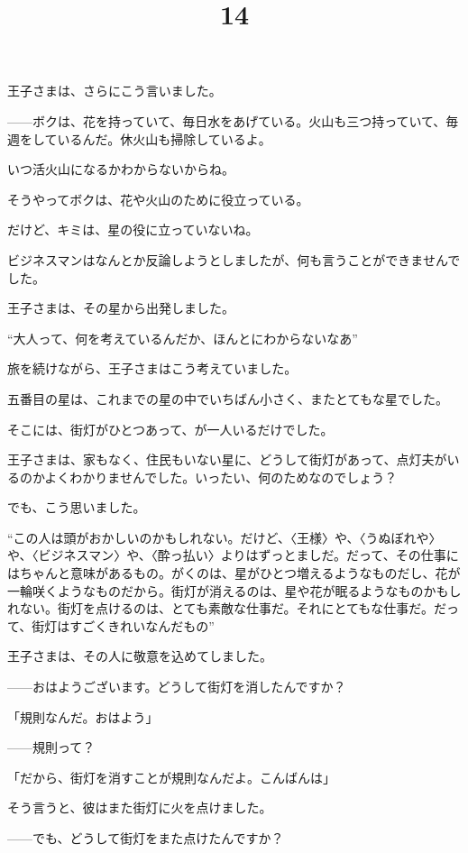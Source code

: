 王子さまは、さらにこう言いました。

——ボクは、花を持っていて、毎日水をあげている。火山も三つ持っていて、毎週をしているんだ。休火山も掃除しているよ。

いつ活火山になるかわからないからね。

そうやってボクは、花や火山のために役立っている。

だけど、キミは、星の役に立っていないね。

ビジネスマンはなんとか反論しようとしましたが、何も言うことができませんでした。

王子さまは、その星から出発しました。

“大人って、何を考えているんだか、ほんとにわからないなあ”

旅を続けながら、王子さまはこう考えていました。


\title{14}


五番目の星は、これまでの星の中でいちばん小さく、またとてもな星でした。

そこには、街灯がひとつあって、が一人いるだけでした。

王子さまは、家もなく、住民もいない星に、どうして街灯があって、点灯夫がいるのかよくわかりませんでした。いったい、何のためなのでしょう？

でも、こう思いました。

“この人は頭がおかしいのかもしれない。だけど、〈王様〉や、〈うぬぼれや〉や、〈ビジネスマン〉や、〈酔っ払い〉よりはずっとましだ。だって、その仕事にはちゃんと意味があるもの。がくのは、星がひとつ増えるようなものだし、花が一輪咲くようなものだから。街灯が消えるのは、星や花が眠るようなものかもしれない。街灯を点けるのは、とても素敵な仕事だ。それにとてもな仕事だ。だって、街灯はすごくきれいなんだもの”

王子さまは、その人に敬意を込めてしました。

——おはようございます。どうして街灯を消したんですか？

「規則なんだ。おはよう」

——規則って？

「だから、街灯を消すことが規則なんだよ。こんばんは」

そう言うと、彼はまた街灯に火を点けました。

——でも、どうして街灯をまた点けたんですか？

